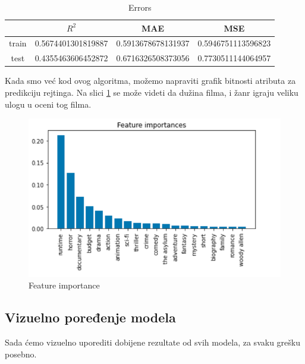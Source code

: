 \documentclass[a4paper]{article}
\begin{document}
\begin{table}[h!]
\caption{Errors}
\centering %
\begin{tabular}{c c c c} %
\hline\hline %
 & ${R}^2$ & MAE & MSE \\ [0.2ex] %
\hline %
train & 0.5674401301819887 & 0.5913678678131937 & 0.5946751113596823 \\ %
test & 0.4355463606452872 & 0.6716326508373056 & 0.7730511144064957 \\ [1ex] %
\end{tabular}
\label{table:table_8}
\end{table}

Kada smo već kod ovog algoritma, možemo napraviti grafik bitnosti atributa za predikciju rejtinga. Na slici \ref{fig:featureImportance} se može videti da dužina filma, i žanr igraju veliku ulogu u oceni tog filma.

\begin{figure}[h!]
\begin{center}
\includegraphics[scale=0.4]{featureImportance.png}
\caption{Feature importance}
\label{fig:featureImportance}
\end{center}
\end{figure}

\pagebreak

\subsection{Vizuelno poređenje modela}
\label{sec:plotting_1}

Sada ćemo vizuelno uporediti dobijene rezultate od svih modela, za svaku grešku posebno.
\end{document}
